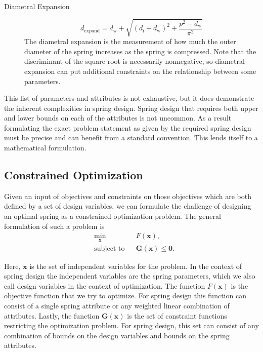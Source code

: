 \documentclass[10pt]{article}
\begin{document}
\begin{description}
			\item[Diametral Expansion]\begin{equation} d_{\text{expand}} = d_{\text{w}} + \sqrt{(d_{\text{i}} + d_{\text{w}})^{2} + \frac{p^{2} - d_{\text{w}}}{\pi^{2}}}
			\end{equation}
				The diametral expansion is the measurement of how much the outer diameter of the spring increases as the spring is compressed. Note that the discriminant of the square root is necessarily nonnegative, so diametral expansion can put additional constraints on the relationship between some parameters. 	
			
			\end{description}

This list of parameters and attributes is not exhaustive, but it does demonstrate the inherent complexities in spring design. Spring design that requires both upper and lower bounds on each of the attributes is not uncommon. As a result formulating the exact problem statement as given by the required spring design must be precise and can benefit from a standard convention. This lends itself to a mathematical formulation.

\subsection{Constrained Optimization}
\label{sec:Constrained_Optimization}

Given an input of objectives and constraints on those objectives which are both defined by a set of design variables, we can formulate the challenge of designing an optimal spring as a constrained optimization problem. The general formulation of such a problem is 
				\begin{equation*}
 					\begin{aligned}
 						& \underset{\textbf{x}}{\text{min}}
 						& & F(\textbf{x}), \\
 						& \text{subject to}
 						& & \mathbf{G}(\textbf{x}) \le \mathbf{0}.
 					\end{aligned}
				\end{equation*}
				
Here, $\mathbf{x}$ is the set of independent variables for the problem. In the context of spring design the independent variables are the spring parameters, which we also call design variables in the context of optimization. The function $F(\mathbf{x})$ is the objective function that we try to optimize. For spring design this function can consist of a single spring attribute or any weighted linear combination of attributes. Lastly, the function $\mathbf{G}(\mathbf{x})$ is the set of constraint functions restricting the optimization problem. For spring design, this set can consist of any combination of bounds on the design variables and bounds on the spring attributes.
\end{document}
